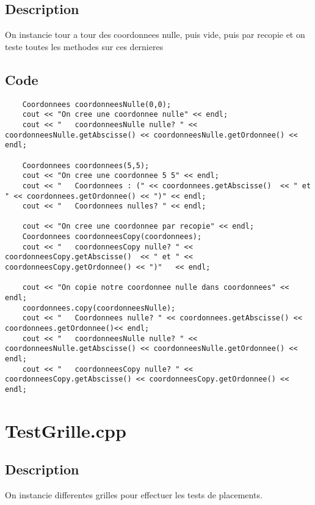         \subsection{Description}
            On instancie tour a tour des coordonnees nulle, puis vide, puis par recopie et on teste toutes les methodes sur ces dernieres
        \subsection{Code}
\begin{lstlisting}
	Coordonnees coordonneesNulle(0,0);
    cout << "On cree une coordonnee nulle" << endl;
    cout << "   coordonneesNulle nulle? " << coordonneesNulle.getAbscisse() << coordonneesNulle.getOrdonnee() << endl;

    Coordonnees coordonnees(5,5);
    cout << "On cree une coordonnee 5 5" << endl;
    cout << "   Coordonnees : (" << coordonnees.getAbscisse()  << " et " << coordonnees.getOrdonnee() << ")" << endl;
    cout << "   Coordonnees nulles? " << endl;

    cout << "On cree une coordonnee par recopie" << endl;
    Coordonnees coordonneesCopy(coordonnees);
    cout << "   coordonneesCopy nulle? " << coordonneesCopy.getAbscisse()  << " et " << coordonneesCopy.getOrdonnee() << ")"   << endl;

    cout << "On copie notre coordonnee nulle dans coordonnees" << endl;
    coordonnees.copy(coordonneesNulle);
    cout << "   Coordonnees nulle? " << coordonnees.getAbscisse() << coordonnees.getOrdonnee()<< endl;
    cout << "   coordonneesNulle nulle? " << coordonneesNulle.getAbscisse() << coordonneesNulle.getOrdonnee() << endl;
    cout << "   coordonneesCopy nulle? " << coordonneesCopy.getAbscisse() << coordonneesCopy.getOrdonnee() << endl;
	\end{lstlisting}
    \section{TestGrille.cpp}
        \subsection{Description}
            On instancie differentes grilles pour effectuer les tests de placements.
